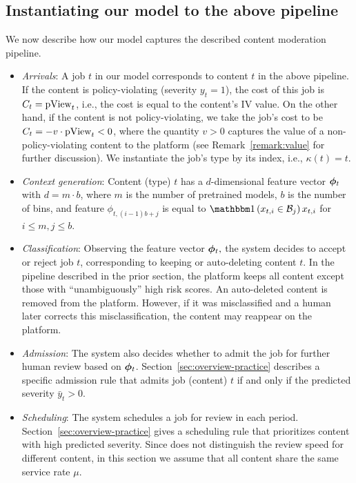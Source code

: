 \subsection{Instantiating our model to the above pipeline}\label{sec:model-instantiate}
We now describe how our model captures the described content moderation pipeline.
\begin{itemize}
\item \emph{Arrivals}: A job $t$ in our model corresponds to content $t$ in the above pipeline. If the content is policy-violating (severity $y_t = 1$), the cost of this job is $C_t = \text{pView}_t$, i.e., the cost is equal to the content's IV value. On the other hand, if the content is not policy-violating, we take the job's cost to be $C_t = -v \cdot \text{pView}_t < 0$, where the quantity $v > 0$ captures the value of a non-policy-violating content to the platform (see Remark~\ref{remark:value} for further discussion). We instantiate the job's type by its index, i.e., $\kappa(t) = t$.
\item \emph{Context generation}: Content (type) $t$ has a $d$-dimensional feature vector $\boldsymbol{\phi}_t$ with $d = m \cdot b$, where $m$ is the number of pretrained models, $b$ is the number of bins, and feature $\phi_{t,(i-1)b + j}$ is equal to $\indic{x_{t,i} \in \set{B}_j}x_{t,i}$ for $i \leq m, j \leq b$. 
\item \emph{Classification}: Observing the feature vector $\boldsymbol{\phi}_t,$ the system decides to accept or reject job $t$, corresponding to keeping or auto-deleting content $t$. In the pipeline described in the prior section, the platform keeps all content except those with ``unambiguously'' high risk scores. An auto-deleted content is removed from the platform. However, if it was misclassified and a human later corrects this misclassification, the content may reappear on the platform.
\item \emph{Admission}: The system also decides whether to admit the job for further human review based on $\boldsymbol{\phi}_t$. Section~\ref{sec:overview-practice} describes a specific admission rule that admits job (content) $t$ if and only if the predicted severity $\bar{y}_t > 0$.
\item \emph{Scheduling}: The system schedules a job for review in each period. Section~\ref{sec:overview-practice} gives a scheduling rule that prioritizes content with high predicted severity. Since \cite{Avadhanula2022} does not distinguish the review speed for different content, in this section we assume that all content share the same service rate $\mu$.

\end{itemize}
